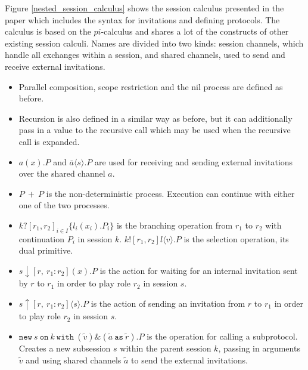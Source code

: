 \documentclass[12pt,twoside]{report}
\begin{document}
Figure \ref{nested_session_calculus} shows the session calculus presented in the paper which includes the syntax for invitations and defining protocols. The calculus is based on the $pi$-calculus and shares a lot of the constructs of other existing session calculi\cite{logicaassertions}. Names are divided into two kinds: session channels, which handle all exchanges within a session, and shared channels, used to send and receive external invitations. 
\begin{itemize}
    \item Parallel composition, scope restriction and the nil process are defined as before.
    \item Recursion is also defined in a similar way as before, but it can additionally pass in a value to the recursive call which may be used when the recursive call is expanded. 
    \item $a(x).P$ and $\overline{a}\langle s \rangle.P$ are used for receiving and sending external invitations over the shared channel $a$.
    \item $P\ +\ P$ is the non-deterministic process. Execution can continue with either one of the two processes.
    \item $k?[r_1, r_2]_{i \in I} \{l_i(x_i).P_i\}$ is the branching operation from $r_1$ to $r_2$ with continuation $P_i$ in session $k$. $k![r_1, r_2]l \langle v \rangle.P$ is the selection operation, its dual primitive. 
    \item $s \downarrow [r,\ r_1 : r_2](x).P$ is the action for waiting for an internal invitation sent by $r$ to $r_1$ in order to play role $r_2$ in session $s$. 
    \item $s \uparrow [r,\ r_1 : r_2]\langle s \rangle.P$ is the action of sending an invitation from $r$ to $r_1$ in order to play role $r_2$ in session $s$.
    \item $\texttt{new}\ s\ \texttt{on}\ k\ \texttt{with}\ (\widetilde{v})\&(\widetilde{a}\ \texttt{as}\ \widetilde{r}).P$ is the operation for calling a subprotocol. Creates a new subsession $s$ within the parent session $k$, passing in arguments $\widetilde{v}$ and using shared channels $\widetilde{a}$ to send the external invitations.
\end{itemize}
\end{document}
